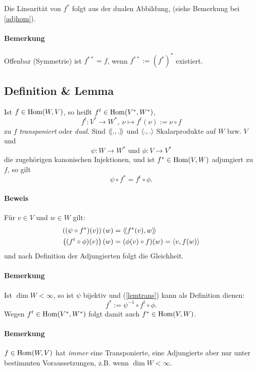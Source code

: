 	Die Linearität von $ f^* $ folgt aus der dualen Abbildung, (siehe Bemerkung bei \ref{adjhom}).
\paragraph{Bemerkung}
	Offenbar (Symmetrie) ist $ f^{**} = f $, wenn $ f^{**} := (f^*)^* $ existiert.

\subsection{Definition \& Lemma}
\begin{Definition}
	Ist $ f\in \operatorname{Hom}(W,V) $, so heißt $ f^t\in \operatorname{Hom}(V^*,W^*) $,
		\[ f^t:V^*\to W^*,\ \nu\mapsto f^t(\nu):= \nu\circ f \]
	zu $ f $ \emph{transponiert} oder \emph{dual}. Sind $ \langle\! \langle .,. \rangle\! \rangle $ und $ \langle .,. \rangle $ Skalarprodukte auf $ W $ bzw. $ V $ und
		\[ \psi:W\to W^*\text{ und }\phi:V\to V^* \]
	die zugehörigen kanonischen Injektionen, und ist $ f^*\in \operatorname{Hom}(V,W) $ adjungiert zu $ f $, so gilt
	\begin{equation}
		\psi \circ f^* = f^t\circ \phi. \tag{$\star$}
		\label{lemtrans}
	\end{equation}

\end{Definition}
\paragraph{Beweis}
	Für $ v\in V $ und $ w\in W $ gilt:
		\begin{align*}
			\left((\psi\circ f^*)(v)\right)(w) &= \langle\! \langle f^*(v),w \rangle\! \rangle\\
			\left((f^t\circ \phi)(v)\right)(w) &= (\phi(v)\circ f)(w) = \langle v,f(w) \rangle
		\end{align*}
	und nach Definition der Adjungierten folgt die Gleichheit.
\paragraph{Bemerkung}
	Ist $ \dim W<\infty $, so ist $ \psi $ bijektiv und (\ref{lemtrans}) kann als Definition dienen:
		\[ f^* := \psi^{-1}\circ f^t\circ \phi. \]
	Wegen $ f^t\in \operatorname{Hom}(V^*,W^*) $ folgt damit auch $ f^*\in \operatorname{Hom}(V,W) $.\label{adjhom}
\paragraph{Bemerkung}
	$ f\in \operatorname{Hom}(W,V) $ hat \emph{immer} eine Transponierte, eine Adjungierte aber nur unter bestimmten Voraussetzungen, z.B. wenn $ \dim W < \infty $.
